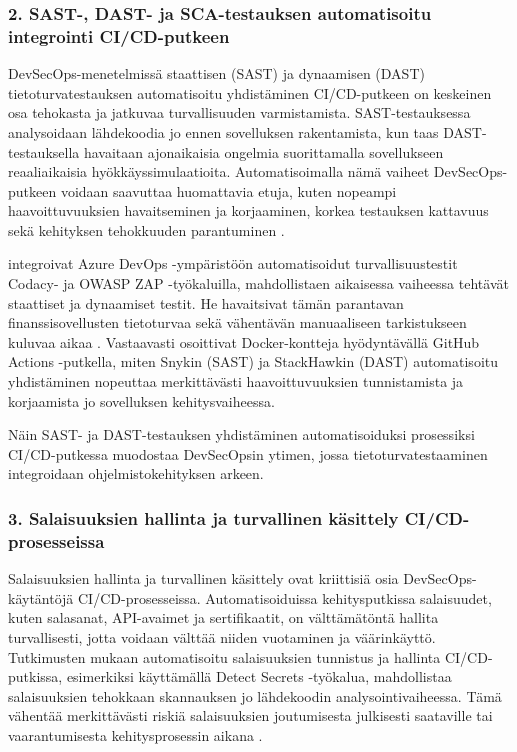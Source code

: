 \documentclass[bscthesis,finnish,oneside,biblatex]{uefcsthesis}
\begin{document}
\subsubsection{2. SAST-, DAST- ja SCA-testauksen automatisoitu integrointi CI/CD-putkeen}

DevSecOps-menetelmissä staattisen (SAST) ja dynaamisen (DAST) tietoturvatestauksen automatisoitu yhdistäminen CI/CD-putkeen on keskeinen osa tehokasta ja jatkuvaa turvallisuuden varmistamista. SAST-testauksessa analysoidaan lähdekoodia jo ennen sovelluksen rakentamista, kun taas DAST-testauksella havaitaan ajonaikaisia ongelmia suorittamalla sovellukseen reaaliaikaisia hyökkäyssimulaatioita. Automatisoimalla nämä vaiheet DevSecOps-putkeen voidaan saavuttaa huomattavia etuja, kuten nopeampi haavoittuvuuksien havaitseminen ja korjaaminen, korkea testauksen kattavuus sekä kehityksen tehokkuuden parantuminen \cite{feio2024_empirical,kushwaha2024_cct}.

\cite{kushwaha2024_cct} integroivat Azure DevOps -ympäristöön automatisoidut turvallisuustestit Codacy- ja OWASP ZAP -työkaluilla, mahdollistaen aikaisessa vaiheessa tehtävät staattiset ja dynaamiset testit. He havaitsivat tämän parantavan finanssisovellusten tietoturvaa sekä vähentävän manuaaliseen tarkistukseen kuluvaa aikaa \cite{kushwaha2024_cct}. Vastaavasti \cite{marandi2023_ias} osoittivat Docker-kontteja hyödyntävällä GitHub Actions -putkella, miten Snykin (SAST) ja StackHawkin (DAST) automatisoitu yhdistäminen nopeuttaa merkittävästi haavoittuvuuksien tunnistamista ja korjaamista jo sovelluksen kehitysvaiheessa.

Näin SAST- ja DAST-testauksen yhdistäminen automatisoiduksi prosessiksi CI/CD-putkessa muodostaa DevSecOpsin ytimen, jossa tietoturvatestaaminen integroidaan ohjelmistokehityksen arkeen.

\subsubsection{3. Salaisuuksien hallinta ja turvallinen käsittely CI/CD-prosesseissa}

Salaisuuksien hallinta ja turvallinen käsittely ovat kriittisiä osia DevSecOps-käytäntöjä CI/CD-prosesseissa. Automatisoiduissa kehitysputkissa salaisuudet, kuten salasanat, API-avaimet ja sertifikaatit, on välttämätöntä hallita turvallisesti, jotta voidaan välttää niiden vuotaminen ja väärinkäyttö. Tutkimusten mukaan automatisoitu salaisuuksien tunnistus ja hallinta CI/CD-putkissa, esimerkiksi käyttämällä Detect Secrets -työkalua, mahdollistaa salaisuuksien tehokkaan skannauksen jo lähdekoodin analysointivaiheessa. Tämä vähentää merkittävästi riskiä salaisuuksien joutumisesta julkisesti saataville tai vaarantumisesta kehitysprosessin aikana \cite{aljohani2023_automating}.
\end{document}
